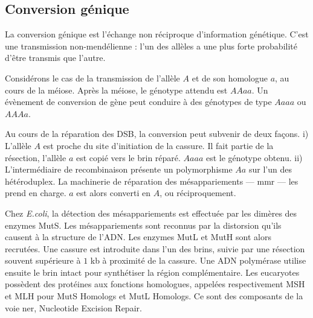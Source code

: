 \documentclass[11pt, oneside]{scrartcl}
\begin{document}

\subsection{Conversion génique}
\label{sec:orgheadline6}

La conversion génique est l'échange non réciproque d'information génétique.
C'est une transmission non-mendélienne : l'un des allèles a une plus forte
probabilité d'être transmis que l'autre\cite{chen_gene_2007}. 

Considérons le cas de la transmission de l'allèle \(A\) et de son homologue \(a\),
au cours de la méiose. Après la méiose, le génotype attendu est \(AAaa\). Un
évènement de conversion de gène peut conduire à des génotypes de type \(Aaaa\) ou
\(AAAa\).

Au cours de la réparation des DSB, la conversion peut subvenir de deux façons.
i) L'allèle \(A\) est proche du site d'initiation de la cassure. Il fait partie de
la résection, l'allèle \(a\) est copié vers le brin réparé. \(Aaaa\) est le génotype
obtenu. ii) L'intermédiaire de recombinaison présente un polymorphisme \(Aa\) sur
l'un des hétéroduplex. La machinerie de réparation des mésappariements ---
\ac{mmr} --- les prend en charge. \(a\) est alors converti en \(A\), ou
réciproquement.

Chez \emph{E.coli}, la détection des mésappariements est effectuée par les dimères
des enzymes MutS. Les mésappariements sont reconnus par la distorsion qu'ils
causent à la structure de l'ADN. Les enzymes MutL et MutH sont alors recrutées.
Une cassure est introduite dans l'un des brins, suivie par une résection souvent
supérieure à \(1\) kb à proximité de la cassure. Une ADN polymérase utilise
ensuite le brin intact pour synthétiser la région complémentaire. Les eucaryotes
possèdent des protéines aux fonctions homologues, appelées respectivement MSH et
MLH pour MutS Homologs et MutL Homologs. Ce sont des composants de la voie
\ac{ner}, Nucleotide Excision Repair.
\end{document}
